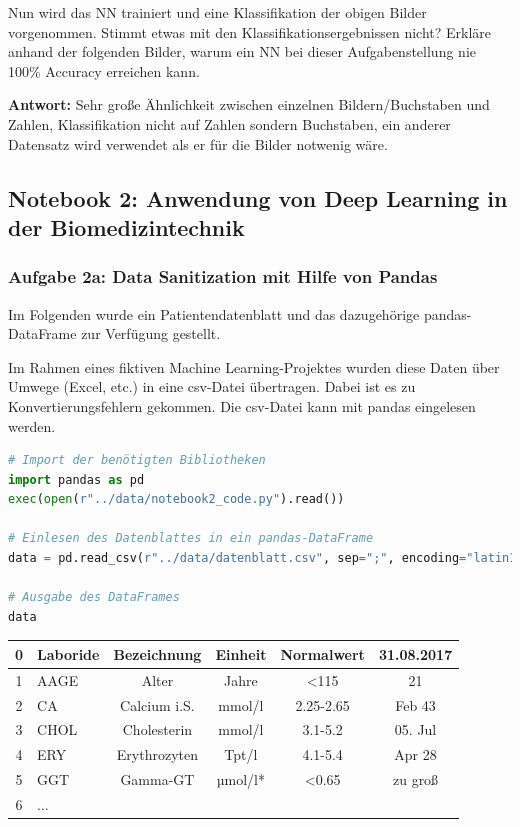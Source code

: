 \documentclass[a4paper,10pt,titlepage]{scrartcl}
\begin{document}
Nun wird das NN trainiert und eine Klassifikation der obigen Bilder vorgenommen. Stimmt etwas mit den Klassifikationsergebnissen nicht? Erkläre anhand der folgenden Bilder, warum ein NN bei dieser Aufgabenstellung nie 100\% Accuracy erreichen kann.

\textbf{Antwort:} Sehr große Ähnlichkeit zwischen einzelnen Bildern/Buchstaben und Zahlen, Klassifikation nicht auf Zahlen sondern Buchstaben, ein anderer Datensatz wird verwendet als er für die Bilder notwenig wäre.

\subsection{Notebook 2: Anwendung von Deep Learning in der Biomedizintechnik}
\subsubsection{Aufgabe 2a: Data Sanitization mit Hilfe von Pandas}
Im Folgenden wurde ein Patientendatenblatt und das dazugehörige pandas-DataFrame zur Verfügung gestellt.

Im Rahmen eines fiktiven Machine Learning-Projektes wurden diese Daten über Umwege (Excel, etc.) in eine csv-Datei übertragen. Dabei ist es zu Konvertierungsfehlern gekommen. Die csv-Datei kann mit pandas eingelesen werden.

\begin{lstlisting}[language=python]
# Import der benötigten Bibliotheken
import pandas as pd
exec(open(r"../data/notebook2_code.py").read())

# Einlesen des Datenblattes in ein pandas-DataFrame
data = pd.read_csv(r"../data/datenblatt.csv", sep=";", encoding="latin1")

# Ausgabe des DataFrames
data
\end{lstlisting}

\begin{tabular}{c|l|c|c|c|c}
    0  & Laboride & Bezeichnung       & Einheit & Normalwert & 31.08.2017 \\\hline
    1  & AAGE     & Alter             & Jahre   & <115       & 21         \\
    2  & CA       & Calcium i.S.      & mmol/l  & 2.25-2.65  & Feb 43     \\
    3  & CHOL     & Cholesterin       & mmol/l  & 3.1-5.2    & 05. Jul    \\
    4  & ERY      & Erythrozyten      & Tpt/l   & 4.1-5.4    & Apr 28     \\
    5  & GGT      & Gamma-GT          & µmol/l* & <0.65      & zu groß    \\
    6  & ...
\end{tabular}
\end{document}
